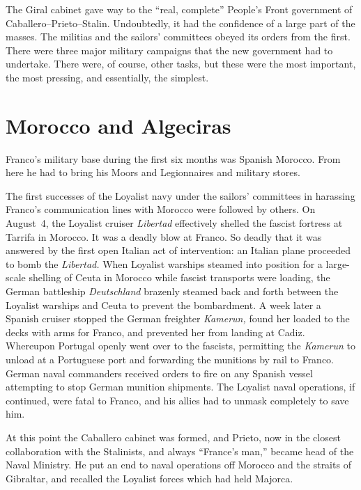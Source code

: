 \indexLCaballero\indexIPrieto{}
The Giral cabinet gave way to the ``real, complete'' People’s Front government of Caballero--Prieto--Stalin. Undoubtedly, it had the confidence of a large part of the masses. The militias and the sailors’ committees obeyed its orders from the first. There were three major military campaigns that the new government had to undertake. There were, of course, other tasks, but these were the most important, the most pressing, and essentially, the simplest.

\section{Morocco and Algeciras}

\indexFFranco{}
Franco’s military base during the first six months was Spanish Morocco. From here he had to bring his Moors and Legionnaires and military stores.

The first successes of the Loyalist navy under the sailors’ committees in harassing Franco’s communication lines with Morocco were followed by others. On August~4, the Loyalist cruiser \emph{Libertad} effectively shelled the fascist fortress at Tarrifa in Morocco. It was a deadly blow at Franco. So deadly that it was answered by the first open Italian act of intervention: an Italian plane proceeded to bomb the \emph{Libertad.} When Loyalist warships steamed into position for a large-scale shelling of Ceuta in Morocco while fascist transports were loading, the German battleship \emph{Deutschland} brazenly steamed back and forth between the Loyalist warships and Ceuta to prevent the bombardment. A week later a Spanish cruiser stopped the German freighter \emph{Kamerun,} found her loaded to the decks with arms for Franco, and prevented her from landing at Cadiz. Whereupon Portugal openly went over to the fascists, permitting the \emph{Kamerun} to unload at a Portuguese port and forwarding the munitions by rail to Franco. German naval commanders received orders to fire on any Spanish vessel attempting to stop German munition shipments. The Loyalist naval operations, if continued, were fatal to Franco, and his allies had to unmask completely to save him.

\indexLCaballero\indexIPrieto{}
At this point the Caballero cabinet was formed, and Prieto, now in the closest collaboration with the Stalinists, and always ``France’s man,'' became head of the Naval Ministry. He put an end to naval operations off Morocco and the straits of Gibraltar, and recalled the Loyalist forces which had held Majorca.

